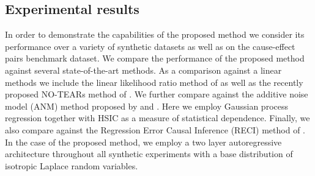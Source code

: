 \documentclass[]{article}
\begin{document}


\subsection{Experimental results}

In order to demonstrate the capabilities of the proposed method we consider its performance over a variety of synthetic 
datasets as well as on the cause-effect pairs benchmark dataset. 
We compare the performance of the proposed method against several state-of-the-art methods. 
As a comparison against a linear methods we include the 
linear likelihood ratio method of \cite{Hyvarinen2013} as well as the recently
proposed NO-TEARs method of \cite{zheng2018dags}.
We further compare against the additive noise model (ANM) method 
proposed by \cite{Hoyer2009} and \cite{Peters2013}. Here we employ Gaussian process 
regression together with HSIC as a measure of statistical dependence. Finally, we also
compare against the Regression Error Causal Inference (RECI) method of 
\cite{Blobaum2018}.
In the case of the proposed method, we 
employ a two layer autoregressive architecture throughout all synthetic experiments
with a base distribution of isotropic Laplace random variables. 
\end{document}
